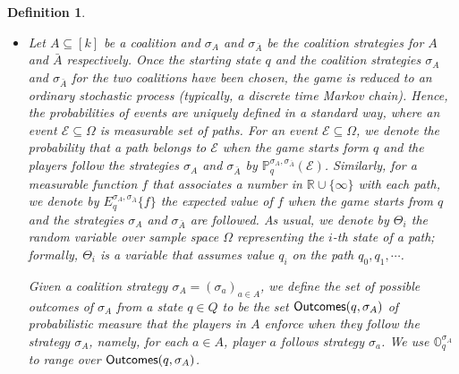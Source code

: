 \documentclass[times, 10 pt,twocolumn]{article}
\newtheorem{definition}[theorem]{Definition}{\bfseries}{\rm}
\newcommand{\mb}[1]{\mathbb{#1}}
\newcommand{\mc}[1]{\mathcal{#1}}
\begin{document}
\begin{definition}
\begin{itemize}
  \item Let $A\subseteq [k]$ be a coalition and $\sigma_A$ and $\sigma_{\bar{A}}$ be the coalition
  strategies for $A$ and $\bar{A}$ respectively. Once the starting state $q$ and the coalition
  strategies $\sigma_A$ and $\sigma_{\bar{A}}$ for the two coalitions have been chosen,
  the game is reduced to an ordinary \emph{stochastic process} (typically,
  a discrete time Markov chain). Hence, the probabilities of \emph{events} are
  uniquely defined in a standard way, where an event $\mc{E}\subseteq \Omega$ is measurable set of
  paths. For an event $\mc{E}\subseteq \Omega$, we denote the probability that a
  path belongs to $\mc{E}$ when the game starts form $q$ and the
  players follow the strategies $\sigma_A$ and $\sigma_{\bar{A}}$ by
  $\mb{P}_q^{\sigma_A, \sigma_{\bar{A}}}(\mc{E})$. Similarly, for
  a measurable function $f$ that associates a number in $\mb{R}\cup\{\infty\}$
  with each path, we denote by $E_q^{\sigma_A, \sigma_{\bar{A}}}\{f\}$ the expected
  value of $f$ when the game starts from $q$ and the strategies $\sigma_A$ and
  $\sigma_{\bar{A}}$ are followed. As usual, we denote by $\Theta_i$ the \emph{random
  variable} over sample space $\Omega$ representing the $i$-th state of a path; formally,
  $\Theta_i$ is a variable that assumes value $q_i$ on the path
  $q_0, q_1,\cdots$.

  Given a coalition strategy $\sigma_{A}=(\sigma_a)_{a\in A}$, we define the
  set of possible \emph{outcomes} of $\sigma_{A}$ from a
  state $q\in Q$ to be the set ${\rm \sf Outcomes}(q, \sigma_A)$ of \emph{probabilistic measure} %
  that the players in $A$ enforce when they follow the strategy $\sigma_{A}$, namely, for each $a\in A$, player $a$ follows
  strategy $\sigma_a$. We use $\mb{O}_q^{\sigma_A}$ to range
  over ${\rm \sf Outcomes}(q, \sigma_A)$.
\end{itemize}
\end{definition}



\end{document}
